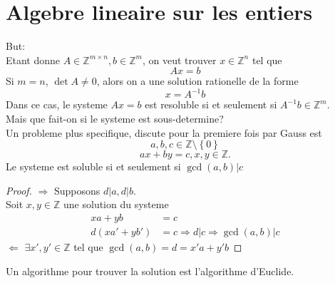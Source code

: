 \documentclass[../main.tex]{subfiles}
\begin{document}
\section{Algebre lineaire sur les entiers}

But:\\
Etant donne $A \in \mathbb{Z}^{m\times n}, b \in \mathbb{Z}^{m}$, on veut trouver $x \in \mathbb{Z}^{n}$ tel que
\[ 
Ax = b
\]
Si $m=n$, $\det A \neq 0$, alors on a une solution rationelle de la forme
\[ 
x= A^{-1}b
\]
Dans ce cas, le systeme $Ax = b$ est resoluble si et seulement si $A^{-1}b \in \mathbb{Z}^{m}$.\\
Mais que fait-on si le systeme est sous-determine?\\
Un probleme plus specifique, discute pour la premiere fois par Gauss est
\[ 
a,b,c \in \mathbb{Z} \setminus \left\{ 0 \right\} 
\]
\[ 
ax + by = c, x,y \in \mathbb{Z}.
\]
Le systeme est soluble si et seulement si $\gcd ( a,b) | c$
\begin{proof}
$\Rightarrow$ Supposons $d|a, d|b$.\\
Soit $x,y \in \mathbb{Z}$ une solution du systeme
\begin{align*}
	xa + yb &= c\\
	d( xa' + yb') &= c \Rightarrow d|c \Rightarrow \gcd( a,b) |c
\end{align*}
$\Leftarrow$ $\exists x', y' \in \mathbb{Z}$ tel que $\gcd( a,b) = d = x' a + y' b$
\end{proof}
Un algorithme pour trouver la solution est l'algorithme d'Euclide.
\end{document}
